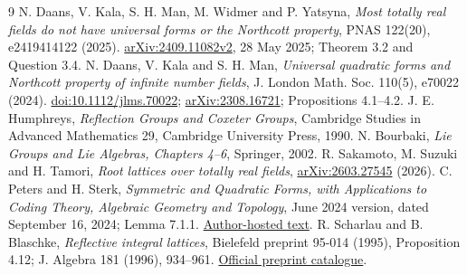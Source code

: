\documentclass[11pt]{article}
\begin{document}
\begin{thebibliography}{9}\small
{} N. Daans, V. Kala, S. H. Man, M. Widmer and P. Yatsyna, \emph{Most totally real fields do not have universal forms or the Northcott property}, PNAS 122(20), e2419414122 (2025). \href{https://arxiv.org/abs/2409.11082v2}{arXiv:2409.11082v2}, 28 May 2025; Theorem 3.2 and Question 3.4.
 N. Daans, V. Kala and S. H. Man, \emph{Universal quadratic forms and Northcott property of infinite number fields}, J. London Math. Soc. 110(5), e70022 (2024). \href{https://doi.org/10.1112/jlms.70022}{doi:10.1112/jlms.70022}; \href{https://arxiv.org/abs/2308.16721}{arXiv:2308.16721}; Propositions 4.1--4.2.
 J. E. Humphreys, \emph{Reflection Groups and Coxeter Groups}, Cambridge Studies in Advanced Mathematics 29, Cambridge University Press, 1990.
 N. Bourbaki, \emph{Lie Groups and Lie Algebras, Chapters 4--6}, Springer, 2002.
 R. Sakamoto, M. Suzuki and H. Tamori, \emph{Root lattices over totally real fields}, \href{https://arxiv.org/abs/2603.27545}{arXiv:2603.27545} (2026).
 C. Peters and H. Sterk, \emph{Symmetric and Quadratic Forms, with Applications to Coding Theory, Algebraic Geometry and Topology}, June 2024 version, dated September 16, 2024; Lemma 7.1.1. \href{https://www-fourier.univ-grenoble-alpes.fr/~peters/Books/QuadraticForms/QuadForms.pdf}{Author-hosted text}.
 R. Scharlau and B. Blaschke, \emph{Reflective integral lattices}, Bielefeld preprint 95-014 (1995), Proposition 4.12; J. Algebra 181 (1996), 934--961. \href{https://www.math.uni-bielefeld.de/sfb343/preprints/index95.html}{Official preprint catalogue}.
\end{thebibliography}
\end{document}
